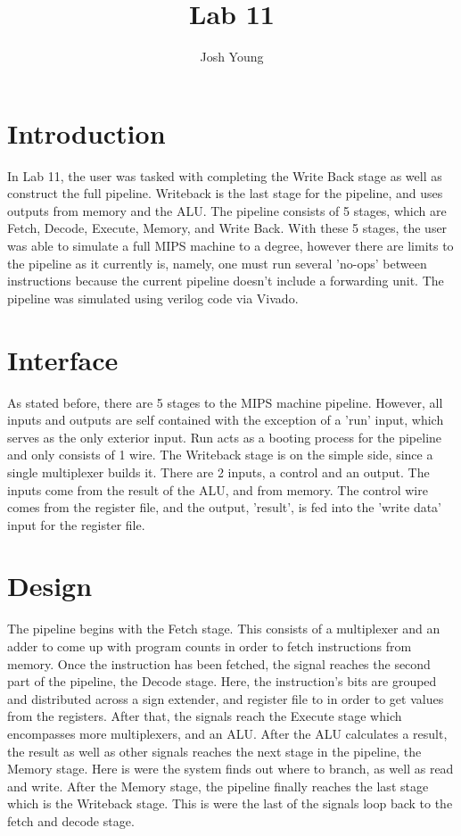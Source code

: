 \documentclass{article}
\author{Josh Young}
\title{Lab 11}
\begin{document}
\maketitle

\section{Introduction}
In Lab 11, the user was tasked with completing the Write Back stage as well as construct the full pipeline. Writeback is the last stage for the pipeline, and uses outputs from memory and the ALU. The pipeline consists of 5 stages, which are Fetch, Decode, Execute, Memory, and Write Back. With these 5 stages, the user was able to simulate a full MIPS machine to a degree, however there are limits to the pipeline as it currently is, namely, one must run several 'no-ops' between instructions because the current pipeline doesn't include a forwarding unit. The pipeline was simulated using verilog code via Vivado.

\section{Interface}
As stated before, there are 5 stages to the MIPS machine pipeline. However, all inputs and outputs are self contained with the exception of a 'run' input, which serves as the only exterior input. Run acts as a booting process for the pipeline and only consists of 1 wire. The Writeback stage is on the simple side, since a single multiplexer builds it. There are 2 inputs, a control and an output. The inputs come from the result of the ALU, and from memory.  The control wire comes from the register file, and the output, 'result', is fed into the 'write data' input for the register file.  

\section{Design}
The pipeline begins with the Fetch stage. This consists of a multiplexer and an adder to come up with program counts in order to fetch instructions from memory. Once the instruction has been fetched, the signal reaches the second part of the pipeline, the Decode stage. Here, the instruction's bits are grouped and distributed across a sign extender, and register file to in order to get values from the registers. After that, the signals reach the Execute stage which encompasses more multiplexers, and an ALU. After the ALU calculates a result, the result as well as other signals reaches the next stage in the pipeline, the Memory stage. Here is were the system finds out where to branch, as well as read and write. After the Memory stage, the pipeline finally reaches the last stage which is the Writeback stage. This is were the last of the signals loop back to the fetch and decode stage.
\end{document}
